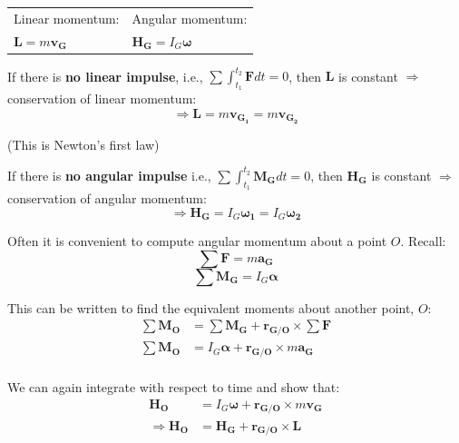 \documentclass[12pt,letterpaper,twoside]{report}
\begin{document}
\begin{center}
\begin{tabu} to .7\textwidth {  X[c]  X[c]  }
Linear momentum: & Angular momentum: \\
$\bm{L} = m \bm{v_G}$ & $\bm{H_G} = I_G \bm{\omega}$\\
\end{tabu}
\end{center}
\vspace*{2\baselineskip}

If there is \textbf{no linear impulse}, i.e., $\sum \int_{t_1}^{t_2} \bm{F} dt = 0$, then $\bm{L}$ is constant $\Rightarrow$ conservation of linear momentum:
\[ \Rightarrow \bm{L} = m \bm{v_{G_1}} = m \bm{v_{G_2}} \]
\begin{center}
(This is Newton’s first law)
\end{center}

If there is \textbf{no angular impulse} i.e., $\sum \int_{t_1}^{t_2} \bm{M_G} dt = 0$, then $\bm{H_G}$ is constant $\Rightarrow$ conservation of angular momentum:
\[ \Rightarrow \bm{H_G} = I_G \bm{\omega_1} = I_G \bm{\omega_2} \]

Often it is convenient to compute angular momentum about a point $O$. Recall:
\[ \sum \bm{F} = m \bm{a_G} \]
\[ \sum \bm{M_G} = I_G \bm{\alpha} \]

\vspace*{4\baselineskip}

This can be written to find the equivalent moments about another point, $O$:
\begin{align*}
\sum \bm{M_O} &= \sum \bm{M_G} + \bm{r_{G/O}} \times \sum \bm{F}\\
\sum \bm{M_O} &= I_G \bm{\alpha} + \bm{r_{G/O}} \times m \bm{a_G}\\
\end{align*}

We can again integrate with respect to time and show that:
\begin{align*}
\bm{H_O} &= I_G \bm{\omega} + \bm{r_{G/O}} \times m \bm{v_G}\\
\Rightarrow \bm{H_O} &= \bm{H_G} + \bm{r_{G/O}} \times \bm{L}\\
\end{align*}
\end{document}
